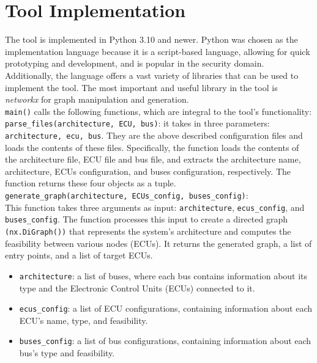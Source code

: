\section{Tool Implementation}
\label{sec:implementation}

The tool is implemented in Python 3.10 and newer.
Python was chosen as the implementation language because it is a script-based language, allowing for quick prototyping and development,
and is popular in the security domain.
Additionally, the language offers a vast variety of libraries that can be used to implement the tool.
The most important and useful library in the tool is \textit{networkx} for graph manipulation and generation.\\

\texttt{main()} calls the following functions, which are integral to the tool's functionality:\\

\texttt{parse\_files(architecture, ECU, bus)}: it takes in three parameters: \texttt{architecture, ecu, bus}.
They are the above described configuration files and loads the contents of these files. 
Specifically, the function loads the contents of the architecture file, ECU file and bus file, 
and extracts the architecture name, architecture, ECUs configuration, and buses configuration, respectively. 
The function returns these four objects as a tuple.\\

\texttt{generate\_graph(architecture, ECUs\_config, buses\_config)}:\\
This function takes three arguments as input: 
\texttt{architecture}, \texttt{ecus\_config}, and \texttt{buses\_config}. 
The function processes this input to create a directed graph \texttt{(nx.DiGraph())} 
that represents the system's architecture and computes the feasibility between various nodes (ECUs). 
It returns the generated graph, a list of entry points, and a list of target ECUs.
\begin{itemize}
    \item \texttt{architecture}: a list of buses, where each bus contains information about its type and the Electronic Control Units (ECUs) connected to it.
    \item \texttt{ecus\_config}: a list of ECU configurations, containing information about each ECU's name, type, and feasibility.
    \item \texttt{buses\_config}: a list of bus configurations, containing information about each bus's type and feasibility.  
\end{itemize}

